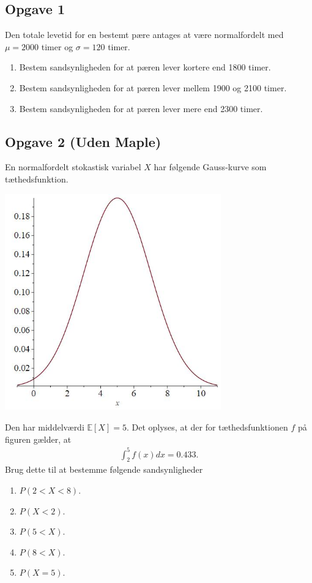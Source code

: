 
\subsection*{Opgave 1}

Den totale levetid for en bestemt pære antages at være normalfordelt med $\mu = 2000$ timer og $\sigma = 120$ timer.

\begin{enumerate}[label=\roman*)]
	\item Bestem sandsynligheden for at pæren lever kortere end 1800 timer.
	\item Bestem sandsynligheden for at pæren lever mellem 1900 og 2100 timer.
	\item Bestem sandsynligheden for at pæren lever mere end 2300 timer. 
\end{enumerate}

\subsection*{Opgave 2 (Uden Maple)}

En normalfordelt stokastisk variabel $X$ har følgende Gauss-kurve som tæthedsfunktion.
\begin{center}
	\includegraphics[width=0.7\textwidth]{Billeder/gauss.jpg}
\end{center}
Den har middelværdi $\mathbb{E}[X] = 5$. Det oplyses, at der for tæthedsfunktionen $f$ på figuren gælder, at
\begin{align*}
	\int_2^5f(x)dx = 0.433.
\end{align*}
Brug dette til at bestemme følgende sandsynligheder
\begin{enumerate}[label=\roman*)]
	\item $P(2<X<8)$.
	\item $P(X<2)$.
	\item $P(5<X)$.
	\item $P(8<X)$.
	\item $P(X=5)$.
\end{enumerate}


